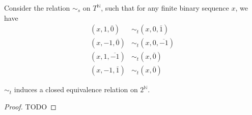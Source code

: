 Consider the relation $\sim_s$ on $T^{\mathbb N}$, 
such that for any finite binary sequence $x$, we have 
\begin{align}
  (x,1,\overline 0) &\sim_t (x ,0, \overline 1) \\
  (x,-1,\overline 0) &\sim_t (x ,0, \overline {-1})\\
  (x,1,\overline {-1}) &\sim_t (x , \overline 0) \\
  (x,-1,\overline {1}) &\sim_t (x , \overline 0) 
\end{align} 
\begin{lemma}
$\sim_t$ induces a closed equivalence relation on $2^\mathbb N$. 
\end{lemma}
\begin{proof}
  TODO
\end{proof} 

